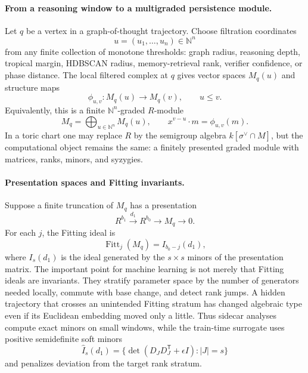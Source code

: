 \documentclass[11pt]{article}
\theoremstyle{definition}
\theoremstyle{plain}
\theoremstyle{remark}
\numberwithin{equation}{section}
\newcommand{\N}{\mathbb{N}}
\newcommand{\transpose}{^{\mathsf T}}
\begin{document}
\paragraph{From a reasoning window to a multigraded persistence module.}
Let $q$ be a vertex in a graph-of-thought trajectory.  Choose filtration coordinates
\begin{equation}
  u=(u_1,\ldots,u_n)\in\N^n
\end{equation}
from any finite collection of monotone thresholds: graph radius, reasoning depth, tropical margin, HDBSCAN radius, memory-retrieval rank, verifier confidence, or phase distance.  The local filtered complex at $q$ gives vector spaces $M_q(u)$ and structure maps
\begin{equation}
  \phi_{u,v}:M_q(u)\to M_q(v),\qquad u\leq v.
\end{equation}
Equivalently, this is a finite $\N^n$-graded $R$-module
\begin{equation}
  M_q=\bigoplus_{u\in\N^n}M_q(u),
  \qquad
  x^{v-u}\cdot m=\phi_{u,v}(m).
\end{equation}
In a toric chart one may replace $R$ by the semigroup algebra $k[\sigma^\vee\cap M]$, but the computational object remains the same: a finitely presented graded module with matrices, ranks, minors, and syzygies.

\paragraph{Presentation spaces and Fitting invariants.}
Suppose a finite truncation of $M_q$ has a presentation
\begin{equation}
  R^{b_1}\xrightarrow{d_1}R^{b_0}\to M_q\to0.
\end{equation}
For each $j$, the Fitting ideal is
\begin{equation}
  \operatorname{Fitt}_j(M_q)=I_{b_0-j}(d_1),
\end{equation}
where $I_s(d_1)$ is the ideal generated by the $s\times s$ minors of the presentation matrix.  The important point for machine learning is not merely that Fitting ideals are invariants.  They stratify parameter space by the number of generators needed locally, commute with base change, and detect rank jumps.  A hidden trajectory that crosses an unintended Fitting stratum has changed algebraic type even if its Euclidean embedding moved only a little.  Thus sidecar analyses compute exact minors on small windows, while the train-time surrogate uses positive semidefinite soft minors
\begin{equation}
  \widehat I_s(d_1)
  =
  \{\det(D_JD_J\transpose+\epsilon I): |J|=s\}
\end{equation}
and penalizes deviation from the target rank stratum.
\end{document}
